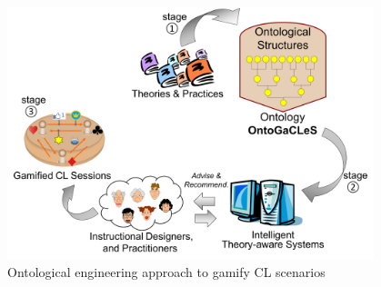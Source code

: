 \begin{figure}[htb]
 \caption{Ontological engineering approach to gamify CL scenarios}
 \label{fig:ontological-engineering-approach-to-gamify-cl-scenarios}
 \centering
 \includegraphics[width=0.95\textwidth]{images/chap-introduction/ontological-engineering-approach-to-gamify-cl-scenarios.png}
 \fautor
\end{figure}

